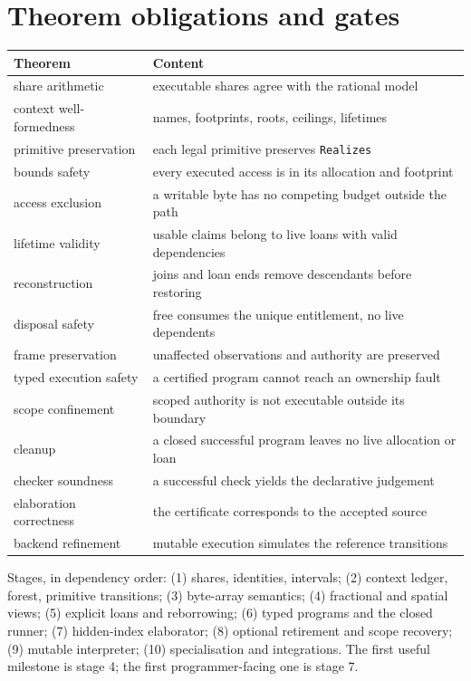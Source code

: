 \documentclass[10pt,a4paper]{article}
\begin{document}
\section{Theorem obligations and gates}\label{sec:obligations}

\begin{center}
\begin{tabular}{@{}lp{}@{}}
\toprule
Theorem & Content \\
\midrule
share arithmetic & executable shares agree with the rational model \\
context well-formedness & names, footprints, roots, ceilings, lifetimes \\
primitive preservation & each legal primitive preserves \texttt{Realizes} \\
bounds safety & every executed access is in its allocation and footprint \\
access exclusion & a writable byte has no competing budget outside the path \\
lifetime validity & usable claims belong to live loans with valid dependencies \\
reconstruction & joins and loan ends remove descendants before restoring \\
disposal safety & free consumes the unique entitlement, no live dependents \\
frame preservation & unaffected observations and authority are preserved \\
typed execution safety & a certified program cannot reach an ownership fault \\
scope confinement & scoped authority is not executable outside its boundary \\
cleanup & a closed successful program leaves no live allocation or loan \\
checker soundness & a successful check yields the declarative judgement \\
elaboration correctness & the certificate corresponds to the accepted source \\
backend refinement & mutable execution simulates the reference transitions \\
\bottomrule
\end{tabular}
\end{center}

Stages, in dependency order: (1) shares, identities, intervals; (2) context
ledger, forest, primitive transitions; (3) byte-array semantics; (4) fractional
and spatial views; (5) explicit loans and reborrowing; (6) typed programs and the
closed runner; (7) hidden-index elaborator; (8) optional retirement and scope
recovery; (9) mutable interpreter; (10) specialisation and integrations. The
first useful milestone is stage 4; the first programmer-facing one is stage 7.
\end{document}
